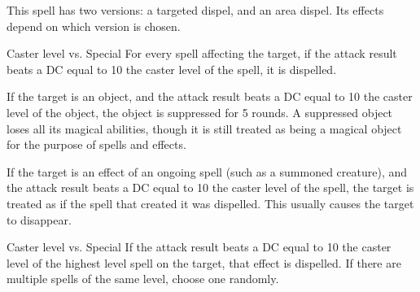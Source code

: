 \begin{spellheader}
    \spellrng{\rngmed}
    \spellspecial This spell has two versions: a targeted dispel, and an area dispel. Its effects depend on which version is chosen.
    \begin{spelltargetinginfo}
    \end{spelltargetinginfo}
    \begin{spelleffects}
        \begin{spelltargetinginfo}
        \end{spelltargetinginfo}
    \end{spelleffects}
\end{spellheader}
\begin{spellcontent}
    \begin{spellattack}{Caster level vs. Special}
        \spelleffect For every spell affecting the target, if the attack result beats a DC equal to 10 \add the caster level of the spell, it is dispelled.

        If the target is an object, and the attack result beats a DC equal to 10 \add the caster level of the object, the object is suppressed for 5 rounds. A suppressed object loses all its magical abilities, though it is still treated as being a magical object for the purpose of spells and effects.

        If the target is an effect of an ongoing spell (such as a summoned creature), and the attack result beats a DC equal to 10 \add the caster level of the spell, the target is treated as if the spell that created it was dispelled. This usually causes the target to disappear.
    \end{spellattack}

    \begin{spellattack}{Caster level vs. Special}
        \spelleffect If the attack result beats a DC equal to 10 \add the caster level of the highest level spell on the target, that effect is dispelled. If there are multiple spells of the same level, choose one randomly.
    \end{spellattack}

\end{spellcontent}
